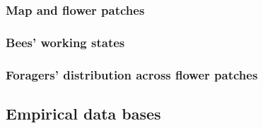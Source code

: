 		\subsubsection{Map and flower patches}
		
		
		\subsubsection{Bees' working states}
			
		
		
		\subsubsection{Foragers' distribution across flower patches}
		
		
	\subsection{Empirical data bases}


